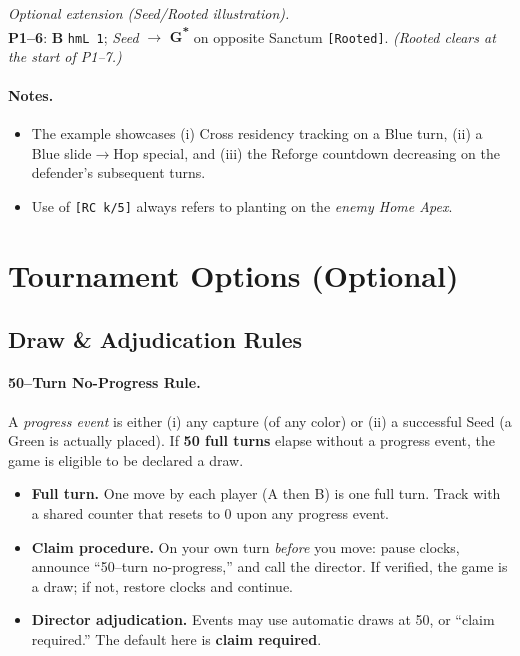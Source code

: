 \documentclass[11pt]{article}
\begin{document}
\noindent\emph{Optional extension (Seed/Rooted illustration).}\\
\textbf{P1--6}: \textbf{B} \texttt{hmL 1}; \emph{Seed} $\rightarrow$ \textbf{G\textsuperscript{*}} on opposite Sanctum \texttt{[Rooted]}. \emph{(Rooted clears at the start of P1--7.)}

\paragraph{Notes.}
\begin{itemize}
  \item The example showcases (i) Cross residency tracking on a Blue turn, (ii) a Blue slide$\rightarrow$Hop special, and (iii) the Reforge countdown decreasing on the defender’s subsequent turns.
  \item Use of \texttt{[RC k/5]} always refers to planting on the \emph{enemy Home Apex}.
\end{itemize}

\section{Tournament Options (Optional)}
\label{sec:tournament-options}

\subsection{Draw \& Adjudication Rules}

\paragraph{50–Turn No-Progress Rule.}
A \emph{progress event} is either (i) any capture (of any color) or (ii) a successful Seed (a Green is actually placed). If \textbf{50 full turns} elapse without a progress event, the game is eligible to be declared a draw.

\begin{itemize}[leftmargin=1.3em,itemsep=0.2em]
  \item \textbf{Full turn.} One move by each player (A then B) is one full turn. Track with a shared counter that resets to 0 upon any progress event.
  \item \textbf{Claim procedure.} On your own turn \emph{before} you move: pause clocks, announce “50–turn no-progress,” and call the director. If verified, the game is a draw; if not, restore clocks and continue.
  \item \textbf{Director adjudication.} Events may use automatic draws at 50, or “claim required.” The default here is \textbf{claim required}.
\end{itemize}
\end{document}
